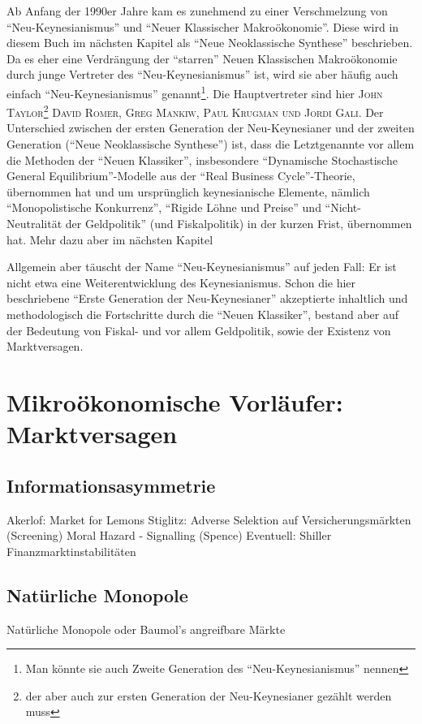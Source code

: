 Ab Anfang der 1990er Jahre kam es zunehmend zu einer Verschmelzung von "`Neu-Keynesianismus"' und "`Neuer Klassischer Makroökonomie"'. Diese wird in diesem Buch im nächsten Kapitel als "`Neue Neoklassische Synthese"' beschrieben. Da es eher eine Verdrängung der "`starren"' Neuen Klassischen Makroökonomie durch junge Vertreter des "`Neu-Keynesianismus"' ist, wird sie aber häufig auch einfach "`Neu-Keynesianismus"' genannt\footnote{Man könnte sie auch Zweite Generation des "`Neu-Keynesianismus"' nennen}. Die Hauptvertreter sind hier \textsc{John Taylor}\footnote{der aber auch zur ersten Generation der Neu-Keynesianer gezählt werden muss} \textsc{David Romer, Greg Mankiw, Paul Krugman und Jordi Gal\i}. Der Unterschied zwischen der ersten Generation der Neu-Keynesianer und der zweiten Generation ("`Neue Neoklassische Synthese"') ist, dass die Letztgenannte vor allem die Methoden der "`Neuen Klassiker"', insbesondere "`Dynamische Stochastische General Equilibrium"'-Modelle aus der "`Real Business Cycle"'-Theorie, übernommen hat und um ursprünglich keynesianische Elemente, nämlich "`Monopolistische Konkurrenz"', "`Rigide Löhne und Preise"' und "`Nicht-Neutralität der Geldpolitik"' (und Fiskalpolitik) in der kurzen Frist, übernommen hat. Mehr dazu aber im nächsten Kapitel

Allgemein aber täuscht der Name "`Neu-Keynesianismus"' auf jeden Fall: Er ist nicht etwa eine Weiterentwicklung des Keynesianismus. Schon die hier beschriebene "`Erste Generation der Neu-Keynesianer"' akzeptierte inhaltlich und methodologisch die Fortschritte durch die "`Neuen Klassiker"', bestand aber auf der Bedeutung von Fiskal- und vor allem Geldpolitik, sowie der Existenz von Marktversagen. 

\section{Mikroökonomische Vorläufer: Marktversagen} \label{cha: Marktversagen}

\subsection{Informationsasymmetrie}
Akerlof: Market for Lemons
Stiglitz: Adverse Selektion auf Versicherungsmärkten (Screening)
Moral Hazard - Signalling (Spence)
Eventuell: Shiller Finanzmarktinstabilitäten

\subsection{Natürliche Monopole}
Natürliche Monopole oder Baumol's angreifbare Märkte



